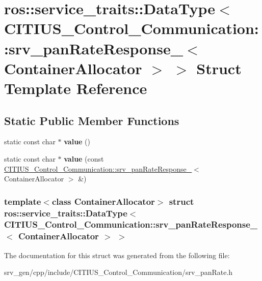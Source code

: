 \hypertarget{structros_1_1service__traits_1_1_data_type_3_01_c_i_t_i_u_s___control___communication_1_1srv__pad3cdbb0f51c65ba1450ce5b684d551e4}{\section{ros\-:\-:service\-\_\-traits\-:\-:\-Data\-Type$<$ \-C\-I\-T\-I\-U\-S\-\_\-\-Control\-\_\-\-Communication\-:\-:srv\-\_\-pan\-Rate\-Response\-\_\-$<$ \-Container\-Allocator $>$ $>$ \-Struct \-Template \-Reference}
\label{structros_1_1service__traits_1_1_data_type_3_01_c_i_t_i_u_s___control___communication_1_1srv__pad3cdbb0f51c65ba1450ce5b684d551e4}
}
\subsection*{\-Static \-Public \-Member \-Functions}
\begin{DoxyCompactItemize}
\item 
\hypertarget{structros_1_1service__traits_1_1_data_type_3_01_c_i_t_i_u_s___control___communication_1_1srv__pad3cdbb0f51c65ba1450ce5b684d551e4_a97d62e9d6705ff46912c90aa3b94e894}{static const char $\ast$ {\bfseries value} ()}\label{structros_1_1service__traits_1_1_data_type_3_01_c_i_t_i_u_s___control___communication_1_1srv__pad3cdbb0f51c65ba1450ce5b684d551e4_a97d62e9d6705ff46912c90aa3b94e894}

\item 
\hypertarget{structros_1_1service__traits_1_1_data_type_3_01_c_i_t_i_u_s___control___communication_1_1srv__pad3cdbb0f51c65ba1450ce5b684d551e4_a28d176cd7aec3febdcece37ec4aed816}{static const char $\ast$ {\bfseries value} (const \hyperlink{struct_c_i_t_i_u_s___control___communication_1_1srv__pan_rate_response__}{\-C\-I\-T\-I\-U\-S\-\_\-\-Control\-\_\-\-Communication\-::srv\-\_\-pan\-Rate\-Response\-\_\-}$<$ \-Container\-Allocator $>$ \&)}\label{structros_1_1service__traits_1_1_data_type_3_01_c_i_t_i_u_s___control___communication_1_1srv__pad3cdbb0f51c65ba1450ce5b684d551e4_a28d176cd7aec3febdcece37ec4aed816}

\end{DoxyCompactItemize}
\subsubsection*{template$<$class Container\-Allocator$>$ struct ros\-::service\-\_\-traits\-::\-Data\-Type$<$ C\-I\-T\-I\-U\-S\-\_\-\-Control\-\_\-\-Communication\-::srv\-\_\-pan\-Rate\-Response\-\_\-$<$ Container\-Allocator $>$ $>$}



\-The documentation for this struct was generated from the following file\-:\begin{DoxyCompactItemize}
\item 
srv\-\_\-gen/cpp/include/\-C\-I\-T\-I\-U\-S\-\_\-\-Control\-\_\-\-Communication/srv\-\_\-pan\-Rate.\-h\end{DoxyCompactItemize}
